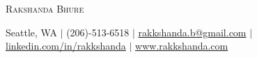 \documentclass[letterpaper,11pt]{article}
\begin{document}
\begin{center}

{\Huge \scshape Rakshanda Bhure} \\ \vspace{2pt}

\small Seattle, WA $|$ (206)-513-6518 $|$
\href{mailto:rakkshanda.b@gmail.com}{rakkshanda.b@gmail.com} $|$
\href{https://linkedin.com/in/rakkshanda}{linkedin.com/in/rakkshanda} $|$
\href{https://www.rakkshanda.com}{www.rakkshanda.com}

\vspace{-6pt}

\end{center}
\end{document}
